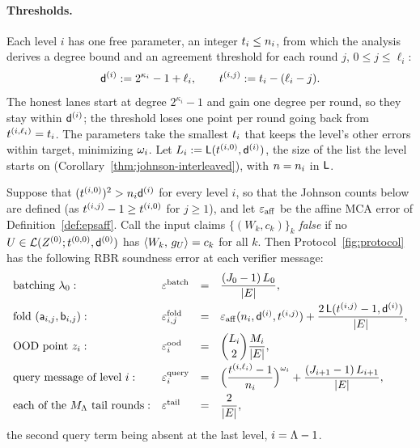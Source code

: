 \paragraph{Thresholds.} Each level $i$ has one free parameter, an integer $t_i\le n_i$, from which the analysis derives a degree bound and an agreement threshold for each round $j$, $0\le j\le\ell_i$:
\[
\mathsf{d}^{(i)} := 2^{\kappa_i}-1+\ell_i,
\qquad
t^{(i,j)} := t_i-(\ell_i-j).
\]
The honest lanes start at degree $2^{\kappa_i}-1$ and gain one degree per round, so they stay within $\mathsf{d}^{(i)}$; the threshold loses one point per round going back from $t^{(i,\ell_i)}=t_i$. The parameters take the smallest $t_i$ that keeps the level's other errors within target, minimizing $\omega_i$. Let $L_i:=\mathsf{L}(t^{(i,0)},\mathsf{d}^{(i)})$, the size of the list the level starts on (Corollary~\ref{thm:johnson-interleaved}), with $n=n_i$ in $\mathsf{L}$.

\begin{theorem}\label{thm:rbr}
Suppose that $(t^{(i,0)})^2>n_i\mathsf{d}^{(i)}$ for every level $i$, so that the Johnson counts below are defined (as $t^{(i,j)}-1\ge t^{(i,0)}$ for $j\ge1$), and let $\varepsilon_{\mathrm{aff}}$ be the affine MCA error of Definition~\ref{def:epsaff}. Call the input claims $\{(W_k, c_k)\}_k$ \emph{false} if no $U \in \mathcal{L}(Z^{(0)};t^{(0,0)},\mathsf{d}^{(0)})$ has $\langle W_k,\, g_U \rangle = c_k$ for all $k$. Then Protocol~\ref{fig:protocol} has the following RBR soundness error at each verifier message:
\[
\begin{array}{llcl}
\textnormal{batching } \lambda_0: & \varepsilon^{\mathrm{batch}} &=& \dfrac{(J_0 - 1)\, L_0}{|E|} , \\[2ex]
\textnormal{fold } (\mathsf{a}_{i,j},\mathsf{b}_{i,j}): & \varepsilon^{\mathrm{fold}}_{i,j} &=& \varepsilon_{\mathrm{aff}}(n_i,\mathsf{d}^{(i)},t^{(i,j)}) + \dfrac{2\,\mathsf{L}(t^{(i,j)}-1,\mathsf{d}^{(i)})}{|E|} , \\[2ex]
\textnormal{OOD point } z_i: & \varepsilon^{\mathrm{ood}}_i &=& \dbinom{L_i}{2} \dfrac{M_i}{|E|} , \\[2ex]
\textnormal{query message of level } i: & \varepsilon^{\mathrm{query}}_i &=& \Bigl(\dfrac{t^{(i,\ell_i)}-1}{n_i}\Bigr)^{\omega_i} + \dfrac{(J_{i+1} - 1)\, L_{i+1}}{|E|} , \\[2ex]
\textnormal{each of the } M_\Lambda \textnormal{ tail rounds}: & \varepsilon^{\mathrm{tail}} &=& \dfrac{2}{|E|} ,
\end{array}
\]
the second query term being absent at the last level, $i=\Lambda-1$. 
\end{theorem}

